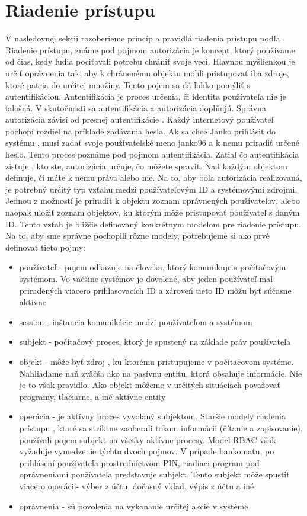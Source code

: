 \section{Riadenie prístupu}
V nasledovnej sekcii rozoberieme princíp a pravidlá riadenia prístupu podľa \cite{kuhn}. Riadenie prístupu, známe pod pojmom autorizácia je koncept, ktorý používame od čias, kedy ľudia pociťovali potrebu chrániť svoje veci. Hlavnou myšlienkou je určiť oprávnenia tak, aby k chránenému objektu mohli pristupovať iba zdroje, ktoré patria do určitej množiny. Tento pojem sa dá ľahko pomýliť s autentifikáciou. Autentifikácia je  proces určenia, či identita používateľa nie je falošná. V skutočnosti sa autentifikácia a autorizácia doplňujú. Správna autorizácia závisí od presnej autentifikácie . Každý internetový používateľ pochopí rozdiel na príklade zadávania hesla. Ak sa chce Janko prihlásiť do systému , musí zadať svoje používateľské meno janko96 a k nemu priradiť určené heslo. Tento proces poznáme pod pojmom autentifikácia.  Zatiaľ čo autentifikácia zisťuje , kto ste, autorizácia určuje, čo môžete spraviť. Nad každým objektom definuje, či máte k nemu práva alebo nie. Na to, aby bola autorizácia realizovaná, je potrebný určitý typ vzťahu medzi používateľovým ID a systémovými zdrojmi. Jednou z možností je priradiť k objektu zoznam oprávnených používateľov, alebo naopak uložiť zoznam objektov, ku ktorým môže pristupovať používateľ s daným ID. Tento vzťah je bližšie definovaný konkrétnym modelom pre riadenie prístupu. Na to, aby sme správne pochopili rôzne modely, potrebujeme si ako prvé definovať tieto pojmy:
\begin{itemize}
	\item používateľ - pojem odkazuje na človeka, ktorý komunikuje s počítačovým systémom. Vo väčšine systémov je dovolené, aby jeden používateľ mal priradených viacero prihlasovacích ID a zároveň tieto ID môžu byť súčasne aktívne  
	\item session - inštancia komunikácie medzi používateľom a systémom
	\item subjekt - počítačový proces, ktorý je spustený na základe práv používateľa
	\item objekt  - môže byť zdroj , ku ktorému pristupujeme v počítačovom systéme. Nahliadame naň zväčša ako na pasívnu entitu, ktorá obsahuje informácie. Nie je to však pravidlo. Ako objekt môžeme v určitých situáciach považovať programy, tlačiarne, a iné aktívne entity
	\item operácia - je aktívny proces vyvolaný subjektom. Staršie modely riadenia prístupu , ktoré sa striktne zaoberali tokom informácii (čítanie a zapisovanie), používali pojem subjekt na všetky aktívne procesy. Model RBAC však vyžaduje vymedzenie týchto dvoch pojmov. V prípade bankomatu, po prihlásení používateľa prostredníctvom PIN, riadiaci program pod oprávneniami používateľa predstavuje subjekt. Tento subjekt môže spustiť viacero operácii- výber z účtu, dočasný vklad, výpis z účtu a iné
	\item oprávnenia - sú povolenia na vykonanie určitej akcie v systéme
\end{itemize}



